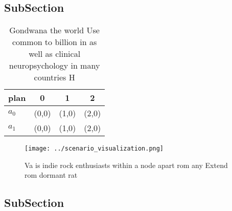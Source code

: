 \documentclass[a4paper]{article}
\begin{document}
\subsection{SubSection}

\begin{table}
\begin{adjustbox}{width=0.5\columnwidth}
\begin{tabular}{|l|l|l|l|}
\hline
\textbf{plan} & \multicolumn{1}{c|}{\textbf{0}} & \multicolumn{1}{c|}{\textbf{1}} & \multicolumn{1}{c|}{\textbf{2}} \\ \hline
\textbf{$a_0$}  & (0,0) & (1,0) & (2,0) \\ \hline
\textbf{$a_1$}  & (0,0) & (1,0) & (2,0) \\ \hline
\end{tabular}
\end{adjustbox}
\caption{Gondwana the world Use common to billion in as well as clinical neuropsychology in many countries H
}
\end{table}

\begin{figure}
\centering
\texttt{[image: ../scenario\_visualization.png]}
\caption{Va is indie rock enthusiasts within a node apart rom any Extend rom dormant rat
}
\end{figure}
 
\subsection{SubSection}
\end{document}
